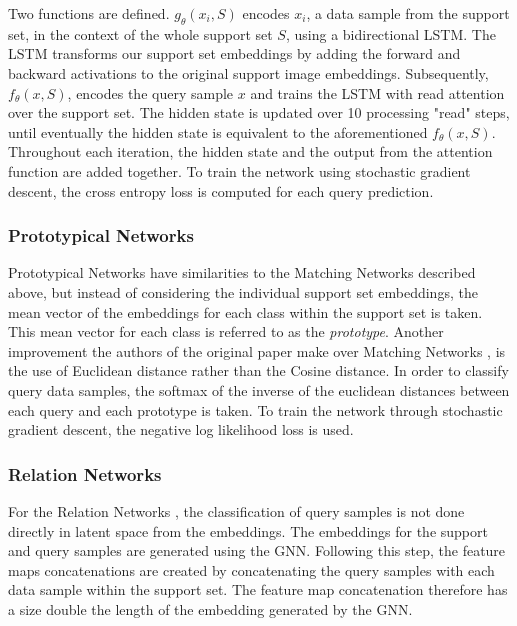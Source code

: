 Two functions are defined. $g_\theta(x_i, S)$ encodes $x_i$, a data sample from the support set, in the context of the whole support set $S$, using a bidirectional LSTM. The LSTM transforms our support set embeddings by adding the forward and backward activations to the original support image embeddings. Subsequently, $f_\theta(x, S)$, encodes the query sample $x$ and trains the LSTM with read attention over the support set. The hidden state is updated over 10 processing "read" steps, until eventually the hidden state is equivalent to the aforementioned $f_\theta(x, S)$. Throughout each iteration, the hidden state and the output from the attention function are added together. To train the network using stochastic gradient descent, the cross entropy loss is computed for each query prediction.

\subsubsection{Prototypical Networks}

Prototypical Networks \citep{snell2017prototypical} have similarities to the Matching Networks described above, but instead of considering the individual support set embeddings, the mean vector of the embeddings for each class within the support set is taken. This mean vector for each class is referred to as the \textit{prototype}. Another improvement the authors of the original paper make over Matching Networks \citep{vinyals2016matching}, is the use of Euclidean distance rather than the Cosine distance. In order to classify query data samples, the softmax of the inverse of the euclidean distances between each query and each prototype is taken. To train the network through stochastic gradient descent, the negative log likelihood loss is used. 

\subsubsection{Relation Networks}

For the Relation Networks \citep{sung2018learning}, the classification of query samples is not done directly in latent space from the embeddings. The embeddings for the support and query samples are generated using the \ac{GNN}. Following this step, the feature maps concatenations are created by concatenating the query samples with each data sample within the support set. The feature map concatenation therefore has a size double the length of the embedding generated by the \ac{GNN}.

